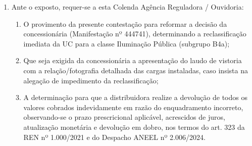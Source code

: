 \begin{enumerate}[resume]
\item Ante o exposto, requer-se a esta Colenda Agência Reguladora / Ouvidoria:
    \begin{enumerate}
    \item O provimento da presente contestação para reformar a decisão da concessionária \nomeConcessionaria{} (Manifestação nº 444741), determinando a reclassificação imediata da UC \unidadeConsumidora{} para a classe Iluminação Pública (subgrupo B4a);
    \item Que seja exigida da concessionária a apresentação do laudo de vistoria com a relação/fotografia detalhada das cargas instaladas, caso insista na alegação de impedimento da reclassificação;
    \item A determinação para que a distribuidora realize a devolução de todos os valores cobrados indevidamente em razão do enquadramento incorreto, observando-se o prazo prescricional aplicável, acrescidos de juros, atualização monetária e devolução em dobro, nos termos do art. 323 da REN nº 1.000/2021 e do Despacho ANEEL nº 2.006/2024.
    \end{enumerate}
\end{enumerate}